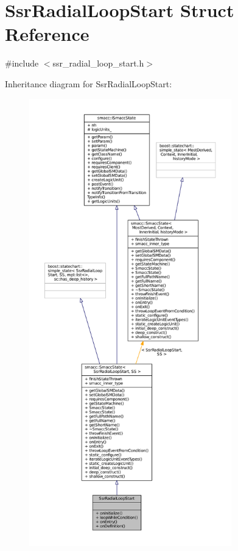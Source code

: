 \hypertarget{structSsrRadialLoopStart}{}\section{Ssr\+Radial\+Loop\+Start Struct Reference}
\label{structSsrRadialLoopStart}


{\ttfamily \#include $<$ssr\+\_\+radial\+\_\+loop\+\_\+start.\+h$>$}



Inheritance diagram for Ssr\+Radial\+Loop\+Start\+:
\nopagebreak
\begin{figure}[H]
\begin{center}
\leavevmode
\includegraphics[height=550pt]{structSsrRadialLoopStart__inherit__graph}
\end{center}
\end{figure}



